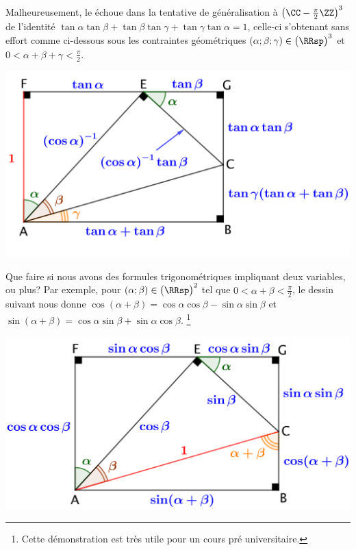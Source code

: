 Malheureusement,
le  échoue dans la tentative de généralisation à $\big( \CC - \frac{\pi}{2} \ZZ \big)^3$ de l'identité
$ \tan \alpha \tan \beta
+ \tan \beta  \tan \gamma
+ \tan \gamma \tan \alpha
= 1$,
celle-ci s'obtenant sans effort comme ci-dessous sous les contraintes géométriques
$(\alpha ; \beta ; \gamma) \in \big( \RRsp \big)^3$
et
$0 < \alpha + \beta + \gamma < \frac{\pi}{2}$.

\begin{center}
	\includegraphics[scale=.75]{sum-tan-prod.png}
\end{center}







\newpage




Que faire si nous avons des formules trigonométriques impliquant deux variables, ou plus?
Par exemple,
pour
$(\alpha ; \beta) \in \big( \RRsp \big)^2$ tel que $0 < \alpha + \beta < \frac{\pi}{2}$,
le dessin suivant nous donne
$\cos(\alpha + \beta) = \cos \alpha \cos \beta - \sin \alpha \sin \beta$
et
$\sin(\alpha + \beta) = \cos \alpha \sin \beta + \sin \alpha \cos \beta$.%
\footnote{
    Cette démonstration est très utile pour un cours pré universitaire.
}

\begin{center}
	\includegraphics[scale=.7]{add-trigo-formulas.png}
\end{center}

